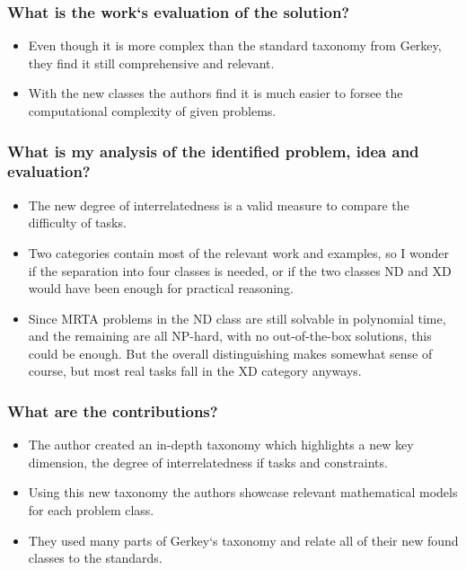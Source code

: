     \subsubsection*{What is the work`s evaluation of the solution?}
    \begin{itemize}
        \item Even though it is more complex than the standard taxonomy from Gerkey, they find it still comprehensive and relevant. 
        \item With the new classes the authors find it is much easier to forsee the computational complexity of given problems.
    \end{itemize}
    \subsubsection*{What is my analysis of the identified problem, idea and evaluation?}
    \begin{itemize}
        \item The new degree of interrelatedness is a valid measure to compare the difficulty of tasks. 
        \item Two categories contain most of the relevant work and examples, so I wonder if the separation into four classes is needed, or if the two classes ND and XD would have been enough for practical reasoning. 
        \item Since MRTA problems in the ND class are still solvable in polynomial time, and the remaining are all NP-hard, with no out-of-the-box solutions, this could be enough. But the overall distinguishing makes somewhat sense of course, but most real tasks fall in the XD category anyways.
    \end{itemize}
    \subsubsection*{What are the contributions?}
    \begin{itemize}
        \item The author created an in-depth taxonomy which highlights a new key dimension, the degree of interrelatedness if tasks and constraints.
        \item Using this new taxonomy the authors showcase relevant mathematical models for each problem class.
        \item They used many parts of Gerkey`s taxonomy and relate all of their new found classes to the standards. 
    \end{itemize}
